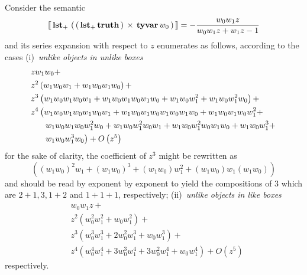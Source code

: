 \begin{example}
Consider the semantic
\begin{displaymath}
    \left\llbracket\,\textbf{lst}_{+}\,\left(\,\left(\,\textbf{lst}_{+}\,\textbf{truth}\,\right)\,\times\,\textbf{tyvar}\,w_{0}\,\right)\,\right\rrbracket = - \frac{w_{0} w_{1} z}{w_{0} w_{1} z + w_{1} z - 1}
\end{displaymath}
and its series expansion with respect to $z$ enumerates as follows,
according to the cases (i)~\textit{unlike objects in unlike boxes}
\begin{displaymath}
\begin{split}
&z w_{1} w_{0} + \\
&z^{2} \left(w_{1} w_{0} w_{1} + w_{1} w_{0} w_{1} w_{0}\right) + \\
&z^{3} \left(w_{1} w_{0} w_{1} w_{0} w_{1} + w_{1} w_{0} w_{1} w_{0} w_{1} w_{0} + w_{1} w_{0} w_{1}^{2} + w_{1} w_{0} w_{1}^{2} w_{0}\right) + \\
&z^{4} \left(w_{1} w_{0} w_{1} w_{0} w_{1} w_{0} w_{1} + w_{1} w_{0} w_{1} w_{0} w_{1} w_{0} w_{1} w_{0} + w_{1} w_{0} w_{1} w_{0} w_{1}^{2} +\right.\\
&\indent\left. w_{1} w_{0} w_{1} w_{0} w_{1}^{2} w_{0} + w_{1} w_{0} w_{1}^{2} w_{0} w_{1} + w_{1} w_{0} w_{1}^{2} w_{0} w_{1} w_{0} + w_{1} w_{0} w_{1}^{3} + \right.\\
&\indent\left.w_{1} w_{0} w_{1}^{3} w_{0}\right) + O\left(z^{5}\right)
\end{split}
\end{displaymath}
for the sake of clarity, the coefficient of $z^{3}$ might be rewritten as
    $$\left((w_{1} w_{0})^{2} w_{1} + (w_{1} w_{0})^{3} + (w_{1} w_{0})
    w_{1}^{2} + (w_{1} w_{0}) w_{1} (w_{1} w_{0})\right)$$ and should be read by
    exponent by exponent to yield the compositions of $3$
    which are $2+1, 3, 1+2$ and $1+1+1$, respectively;
(ii)~\textit{unlike objects in like boxes}
\begin{displaymath}
\begin{split}
&w_{0} w_{1} z +\\
&z^{2} \left(w_{0}^{2} w_{1}^{2} + w_{0} w_{1}^{2}\right) + \\
&z^{3} \left(w_{0}^{3} w_{1}^{3} + 2 w_{0}^{2} w_{1}^{3} + w_{0} w_{1}^{3}\right) + \\
&z^{4} \left(w_{0}^{4} w_{1}^{4} + 3 w_{0}^{3} w_{1}^{4} + 3 w_{0}^{2} w_{1}^{4} + w_{0} w_{1}^{4}\right) + O\left(z^{5}\right)
\end{split}
\end{displaymath}
respectively.
\end{example}

